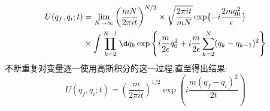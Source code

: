 \begin{eggg}
\begin{equation}
\begin{aligned}
			U(q_f,q_i;t) & =\lim_{N\to\infty}\left(\frac{mN}{2\pi it}\right)^{N/2}\times\sqrt{\frac{2\pi it}{mN}}\exp\{-i\frac{2mq_0^2}{\epsilon}\} \\
			& \times\int\prod_{k=2}^{N-1}\d q_k\exp\left\{i\frac{m}{2\epsilon}q_0^2+i\frac{m}{2\epsilon}\sum_{k=2}^N(q_k-q_{k-1})^2\right\}
		\end{aligned}
	\end{equation}
	不断重复对变量逐一使用高斯积分的这一过程,直至得出结果:
	\begin{equation}
		U(q_f,q_i;t)=\left(\frac{m}{2\pi it}\right)^{1/2}\exp\left(i\frac{m(q_f-q_i)^2}{2t}\right)
	\end{equation}
	
\end{eggg}

